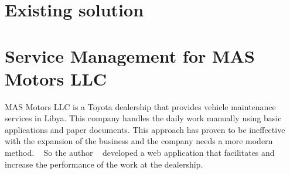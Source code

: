 




\section{Existing solution}


\section{Service Management for MAS Motors LLC}

MAS Motors LLC is a Toyota dealership that provides vehicle maintenance services in Libya.
This company handles the daily work manually using basic applications and paper documents.
This approach has proven to be ineffective with the expansion of the business and the company needs a more modern method. ~\cite{MAS_MOTORS}
So the author ~\citet{MAS_MOTORS} developed a web application that facilitates and increase the performance of the work at the dealership.


